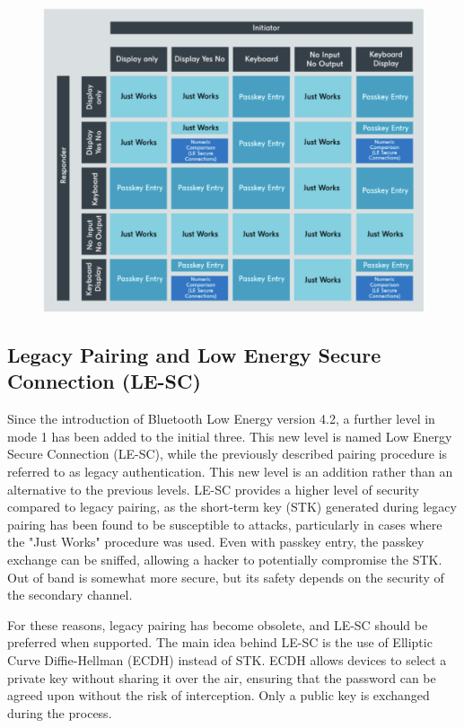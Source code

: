 \documentclass{Configuration_Files/PoliMi3i_thesis}
\begin{document}
\begin{figure}[h]
\centering
\includegraphics[scale=0.7]{Bluetooth_Security/3.png}
\label{fig:pairing_summary}
\end{figure}

\subsection{Legacy Pairing and Low Energy Secure Connection (LE-SC)}

Since the introduction of Bluetooth Low Energy version 4.2, a further level in mode 1 has been added to the initial three. This new level is named Low Energy Secure Connection (LE-SC), while the previously described pairing procedure is referred to as legacy authentication. This new level is an addition rather than an alternative to the previous levels. LE-SC provides a higher level of security compared to legacy pairing, as the short-term key (STK) generated during legacy pairing has been found to be susceptible to attacks, particularly in cases where the "Just Works" procedure was used. Even with passkey entry, the passkey exchange can be sniffed, allowing a hacker to potentially compromise the STK. Out of band is somewhat more secure, but its safety depends on the security of the secondary channel.

For these reasons, legacy pairing has become obsolete, and LE-SC should be preferred when supported. The main idea behind LE-SC is the use of Elliptic Curve Diffie-Hellman (ECDH) instead of STK. ECDH allows devices to select a private key without sharing it over the air, ensuring that the password can be agreed upon without the risk of interception. Only a public key is exchanged during the process.
\end{document}
